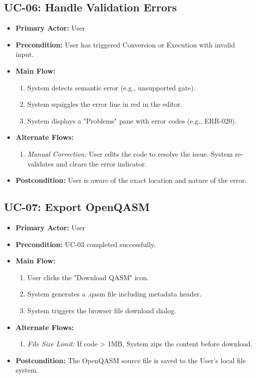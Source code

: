 \subsection{UC-06: Handle Validation Errors}
\begin{itemize}
    \item \textbf{Primary Actor:} User
    \item \textbf{Precondition:} User has triggered Conversion or Execution with invalid input.
    \item \textbf{Main Flow:}
    \begin{enumerate}
        \item System detects semantic error (e.g., unsupported gate).
        \item System squiggles the error line in red in the editor.
        \item System displays a "Problems" pane with error codes (e.g., ERR-020).
    \end{enumerate}
    \item \textbf{Alternate Flows:}
    \begin{enumerate}
        \item [3a] \textit{Manual Correction:} User edits the code to resolve the issue. System re-validates and clears the error indicator.
    \end{enumerate}
    \item \textbf{Postcondition:} User is aware of the exact location and nature of the error.
\end{itemize}

\subsection{UC-07: Export OpenQASM}
\begin{itemize}
    \item \textbf{Primary Actor:} User
    \item \textbf{Precondition:} UC-03 completed successfully.
    \item \textbf{Main Flow:}
    \begin{enumerate}
        \item User clicks the "Download QASM" icon.
        \item System generates a .qasm file including metadata header.
        \item System triggers the browser file download dialog.
    \end{enumerate}
    \item \textbf{Alternate Flows:}
    \begin{enumerate}
        \item [3a] \textit{File Size Limit:} If code > 1MB, System zips the content before download.
    \end{enumerate}
    \item \textbf{Postcondition:} The OpenQASM source file is saved to the User's local file system.
\end{itemize}

